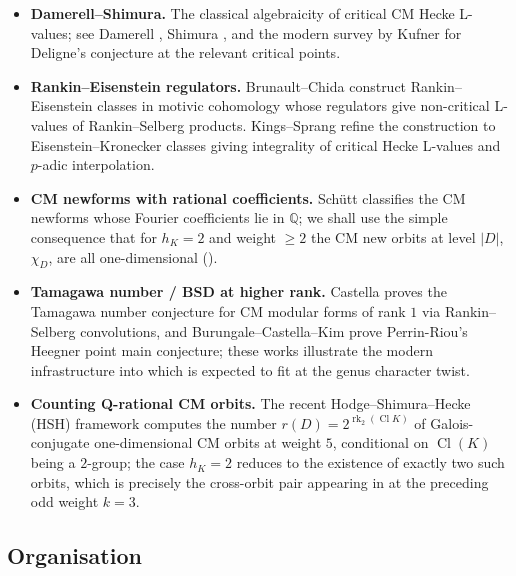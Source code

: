 \documentclass[11pt]{amsart}
\theoremstyle{definition}
\theoremstyle{remark}
\DeclareMathOperator{\Cl}{Cl}
\DeclareMathOperator{\rk}{rk}
\newcommand{\Q}{\mathbb{Q}}
\newcommand{\chiD}{\chi_D}
\begin{document}
\begin{itemize}
\item \textbf{Damerell--Shimura.} The classical
  algebraicity of critical CM Hecke L-values; see Damerell
  \cite{Damerell1971}, Shimura \cite{Shimura1976,Shimura1978}, and
  the modern survey by Kufner \cite{Kufner2024} for Deligne's
  conjecture at the relevant critical points.
\item \textbf{Rankin--Eisenstein regulators.} Brunault--Chida
  \cite{BrunaultChida2015} construct Rankin--Eisenstein classes in
  motivic cohomology whose regulators give non-critical L-values
  of Rankin--Selberg products. Kings--Sprang \cite{KingsSprang2025}
  refine the construction to Eisenstein--Kronecker classes giving
  integrality of critical Hecke L-values and \(p\)-adic
  interpolation.
\item \textbf{CM newforms with rational coefficients.} Sch\"utt
  \cite{Schuett2008} classifies the CM newforms whose Fourier
  coefficients lie in \(\Q\); we shall use the simple consequence
  that for \(h_{K} = 2\) and weight \(\ge 2\) the CM new orbits at
  level \(|D|\), \(\chiD\), are all one-dimensional
  ().
\item \textbf{Tamagawa number / BSD at higher rank.} Castella
  \cite{Castella2024} proves the Tamagawa number conjecture for CM
  modular forms of rank \(1\) via Rankin--Selberg convolutions, and
  Burungale--Castella--Kim \cite{BurungaleCastellaKim2019} prove
  Perrin-Riou's Heegner point main conjecture; these works
  illustrate the modern infrastructure into which 
  is expected to fit at the genus character twist.
\item \textbf{Counting Q-rational CM orbits.} The recent
  Hodge--Shimura--Hecke (HSH) framework
  \cite{Remondiere2026_HSH} computes the number
  \(r(D) = 2^{\rk_{2}(\Cl K)}\) of Galois-conjugate
  one-dimensional CM orbits at weight \(5\), conditional on
  \(\Cl(K)\) being a \(2\)-group; the case \(h_{K} = 2\) reduces
  to the existence of exactly two such orbits, which is precisely
  the cross-orbit pair appearing in  at the
  preceding odd weight \(k = 3\).
\end{itemize}

\subsection{Organisation}\label{ssec:org}
\end{document}
